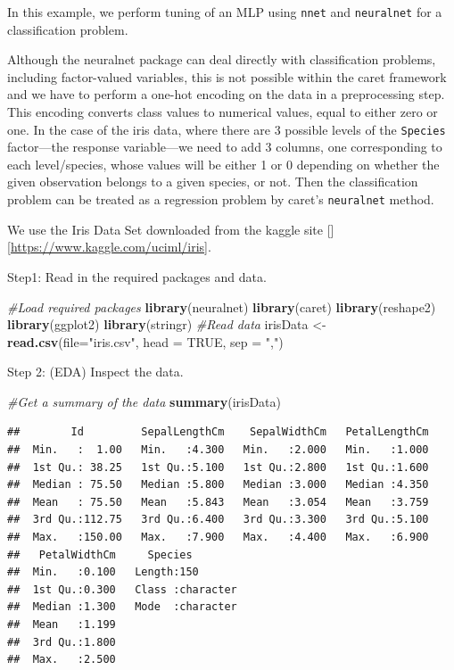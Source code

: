 \documentclass[
]{article}
\author{}
\date{\vspace{-2.5em}}
\newenvironment{Shaded}{\begin{snugshade}}{\end{snugshade}}
\newcommand{\AttributeTok}[1]{\textcolor[rgb]{0.13,0.29,0.53}{#1}}
\newcommand{\CommentTok}[1]{\textcolor[rgb]{0.56,0.35,0.01}{\textit{#1}}}
\newcommand{\ConstantTok}[1]{\textcolor[rgb]{0.56,0.35,0.01}{#1}}
\newcommand{\FunctionTok}[1]{\textcolor[rgb]{0.13,0.29,0.53}{\textbf{#1}}}
\newcommand{\NormalTok}[1]{#1}
\newcommand{\OtherTok}[1]{\textcolor[rgb]{0.56,0.35,0.01}{#1}}
\newcommand{\StringTok}[1]{\textcolor[rgb]{0.31,0.60,0.02}{#1}}
\begin{document}
In this example, we perform tuning of an MLP using \texttt{nnet} and
\texttt{neuralnet} for a classification problem.

Although the neuralnet package can deal directly with classification
problems, including factor-valued variables, this is not possible within
the caret framework and we have to perform a one-hot encoding on the
data in a preprocessing step. This encoding converts class values to
numerical values, equal to either zero or one. In the case of the iris
data, where there are 3 possible levels of the \texttt{Species}
factor---the response variable---we need to add 3 columns, one
corresponding to each level/species, whose values will be either 1 or 0
depending on whether the given observation belongs to a given species,
or not. Then the classification problem can be treated as a regression
problem by caret's \texttt{neuralnet} method.

We use the Iris Data Set downloaded from the kaggle site
{[}{]}{[}\url{https://www.kaggle.com/uciml/iris}{]}.

Step1: Read in the required packages and data.

\begin{Shaded}
\begin{Highlighting}[]
\CommentTok{\#Load required packages}
\FunctionTok{library}\NormalTok{(neuralnet)}
\FunctionTok{library}\NormalTok{(caret)}
\FunctionTok{library}\NormalTok{(reshape2)}
\FunctionTok{library}\NormalTok{(ggplot2)}
\FunctionTok{library}\NormalTok{(stringr)}
\CommentTok{\#Read  data}
\NormalTok{irisData }\OtherTok{\textless{}{-}} \FunctionTok{read.csv}\NormalTok{(}\AttributeTok{file=}\StringTok{"iris.csv"}\NormalTok{, }\AttributeTok{head =} \ConstantTok{TRUE}\NormalTok{, }\AttributeTok{sep =} \StringTok{","}\NormalTok{)}
\end{Highlighting}
\end{Shaded}

Step 2: (EDA) Inspect the data.

\begin{Shaded}
\begin{Highlighting}[]
\CommentTok{\#Get a summary of the data}
\FunctionTok{summary}\NormalTok{(irisData)}
\end{Highlighting}
\end{Shaded}

\begin{verbatim}
##        Id         SepalLengthCm    SepalWidthCm   PetalLengthCm  
##  Min.   :  1.00   Min.   :4.300   Min.   :2.000   Min.   :1.000  
##  1st Qu.: 38.25   1st Qu.:5.100   1st Qu.:2.800   1st Qu.:1.600  
##  Median : 75.50   Median :5.800   Median :3.000   Median :4.350  
##  Mean   : 75.50   Mean   :5.843   Mean   :3.054   Mean   :3.759  
##  3rd Qu.:112.75   3rd Qu.:6.400   3rd Qu.:3.300   3rd Qu.:5.100  
##  Max.   :150.00   Max.   :7.900   Max.   :4.400   Max.   :6.900  
##   PetalWidthCm     Species         
##  Min.   :0.100   Length:150        
##  1st Qu.:0.300   Class :character  
##  Median :1.300   Mode  :character  
##  Mean   :1.199                     
##  3rd Qu.:1.800                     
##  Max.   :2.500
\end{verbatim}
\end{document}
